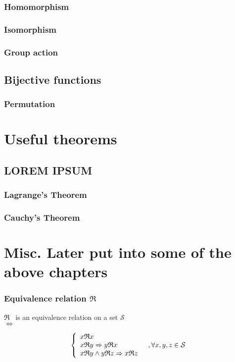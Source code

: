 \documentclass[a4paper,11pt]{kth-mag}
\newcommand{\REL}{\ensuremath{\mathfrak{R}}}
\renewcommand{\SS}{\ensuremath{\mathcal{S}}}
\begin{document}
\subsection{Homomorphism}
\subsection{Isomorphism}
\subsection{Group action}

\section{Bijective functions}
\subsection{Permutation}

\chapter{Useful theorems}

\section{LOREM IPSUM}
\subsection{Lagrange's Theorem}
\subsection{Cauchy's Theorem}


\chapter{Misc. Later put into some of the above chapters}

\subsection{Equivalence relation \REL}
\begin{center}
\REL~ is an equivalence relation on a set \SS~ \\
$\Leftrightarrow$
\end{center}

\begin{equation}\left\{
    \begin{array}{l l}
        x \REL x & \\
        x \REL y \Rightarrow y \REL x & \\
        x \REL y \wedge y \REL z \Rightarrow x \REL z & 
    \end{array} , \forall x,y,z \in \SS
\right.\end{equation}
\end{document}
